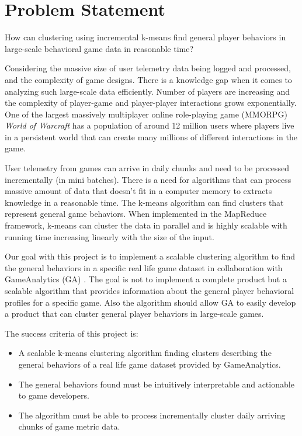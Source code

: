\section{Problem Statement}

{\addtolength{\leftskip}{5mm} How can clustering using incremental k-means find general player behaviors in large-scale behavioral game data in reasonable time? \par}

Considering the massive size of user telemetry data being logged and processed, and the complexity of game designs. There is a knowledge gap when it comes to analyzing such large-scale data efficiently. Number of players are increasing and the complexity of player-game and player-player interactions grows exponentially. One of the largest massively multiplayer online role-playing game (MMORPG) \textit{World of Warcraft} has a population of around 12 million users where players live in a persistent world that can create many millions of different interactions in the game. 

User telemetry from games can arrive in daily chunks and need to be processed incrementally (in mini batches). There is a need for algorithms that can process massive amount of data that doesn't fit in a computer memory to extracts knowledge in a reasonable time. The k-means algorithm can find clusters that represent general game behaviors. When implemented in the MapReduce framework, k-means can cluster the data in parallel and is highly scalable with running time increasing linearly with the size of the input. 

Our goal with this project is to implement a scalable clustering algorithm to find the general behaviors in a specific real life game dataset in collaboration with GameAnalytics (GA) \citep{GA2013}. The goal is not to implement a complete product but a scalable algorithm that provides information about the general player behavioral profiles for a specific game. Also the algorithm should allow GA to easily develop a product that can cluster general player behaviors in large-scale games.

The success criteria of this project is:
\begin{itemize}
\item A scalable k-means clustering algorithm finding clusters describing the general behaviors of a real life game dataset provided by GameAnalytics.
\item The general behaviors found must be intuitively interpretable and actionable to game developers.
\item The algorithm must be able to process incrementally cluster daily arriving chunks of game metric data.
\end{itemize}

